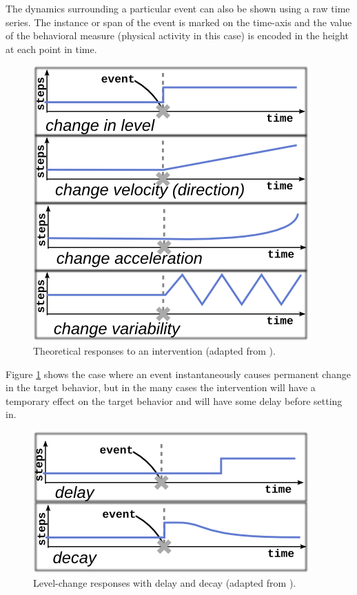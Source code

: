 The dynamics surrounding a particular event can also be shown using a raw time series.
The instance or span of the event is marked on the time-axis and the value of the behavioral measure (physical activity in this case) is encoded in the height at each point in time.

\begin{figure}
\centering
\includegraphics[width=0.6\columnwidth]{./img/exampleDynamicSignals.png}
\caption{Theoretical responses to an intervention (adapted from \cite{glass1975}).}
\label{fig:exampleSignals}
\end{figure}

Figure \ref{fig:exampleSignals} shows the case where an event instantaneously causes permanent change in the target behavior, but in the many cases the intervention will have a temporary effect on the target behavior and will have some delay before setting in.

\begin{figure}
\centering
\includegraphics[width=0.6\columnwidth]{./img/exampleDynamicComplications.png}
\caption{Level-change responses with delay and decay (adapted from \cite{glass1975}).}
\label{fig:exampleComplications}
\end{figure}

